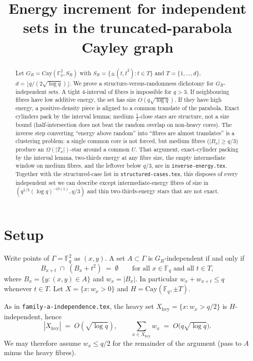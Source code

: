 \documentclass[11pt]{article}
\title{Energy increment for independent sets in the truncated-parabola Cayley graph}
\date{}
\theoremstyle{definition}
\newcommand{\F}{\mathbb{F}}
\begin{document}
\maketitle

\begin{abstract}
Let $G_R=\mathrm{Cay}(\F_q^{2},S_R)$ with $S_R=\{\pm(t,t^{2}):t\in T\}$ and $T=\{1,\dots,d\}$, $d=\lfloor q/(2\sqrt{\log q})\rfloor$.
We prove a structure-versus-randomness dichotomy for $G_R$-independent sets.
A tight 4-interval of fibres is impossible for $q>3$.
If neighbouring fibres have low additive energy, the set has size $O(q\sqrt{\log q})$.
If they have high energy, a positive-density piece is aligned to a common translate of the parabola.
Exact cylinders pack by the interval lemma; medium $\tfrac12$-close stars are structure, not a size bound
(half-intersection does not beat the random overlap on non-heavy cores).
The inverse step converting ``energy above random'' into ``fibres are almost translates'' is a clustering problem: a single common core is not forced, but medium fibres ($|B_x|\ge q/3$) produce an $\Omega(|T_x|)$-star around a common $U$.
That argument, exact-cylinder packing by the interval lemma, two-thirds
energy at any fibre size, the empty intermediate window on medium fibres,
and the leftover below $q/3$, are in
\texttt{inverse-energy.tex}.
Together with the structured-case list in \texttt{structured-cases.tex}, this disposes of every independent set we can describe except intermediate-energy fibres of size in $(q^{1/3}(\log q)^{-O(1)},q/3)$ and thin two-thirds-energy stars that are not exact.
\end{abstract}

\section{Setup}

Write points of $\Gamma=\F_q^{2}$ as $(x,y)$.
A set $A\subset\Gamma$ is $G_R$-independent if and only if
\begin{equation}\label{eq:ind}
  B_{x+t}\;\cap\;(B_x+t^{2})\;=\;\emptyset
  \qquad\text{for all }x\in\F_q\text{ and all }t\in T,
\end{equation}
where $B_x=\{y:(x,y)\in A\}$ and $w_x=|B_x|$.
In particular $w_x+w_{x+t}\le q$ whenever $t\in T$.
Let $X=\{x:w_x>0\}$ and $H=\mathrm{Cay}(\F_q,\pm T)$.

As in \texttt{family-a-independence.tex}, the heavy set $X_{\mathrm{hvy}}=\{x:w_x>q/2\}$ is $H$-independent, hence
\[
  |X_{\mathrm{hvy}}|\;=\;O(\sqrt{\log q}),
  \qquad
  \sum_{x\in X_{\mathrm{hvy}}}w_x\;=\;O\bigl(q\sqrt{\log q}\bigr).
\]
We may therefore assume $w_x\le q/2$ for the remainder of the argument (pass to $A$ minus the heavy fibres).
\end{document}
